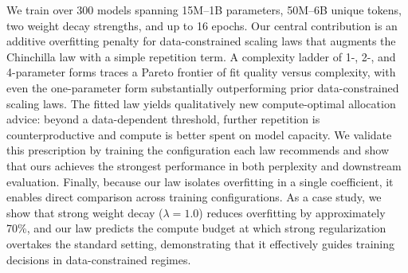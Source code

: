 We train over 300 models spanning 15M--1B parameters, 50M--6B unique tokens, two weight decay strengths, and up to 16 epochs. Our central contribution is an additive overfitting penalty for data-constrained scaling laws that augments the Chinchilla law with a simple repetition term. A complexity ladder of 1-, 2-, and 4-parameter forms traces a Pareto frontier of fit quality versus complexity, with even the one-parameter form substantially outperforming prior data-constrained scaling laws. The fitted law yields qualitatively new compute-optimal allocation advice: beyond a data-dependent threshold, further repetition is counterproductive and compute is better spent on model capacity. We validate this prescription by training the configuration each law recommends and show that ours achieves the strongest performance in both perplexity and downstream evaluation. Finally, because our law isolates overfitting in a single coefficient, it enables direct comparison across training configurations. As a case study, we show that strong weight decay ($\lambda = 1.0$) reduces overfitting by approximately 70\%, and our law predicts the compute budget at which strong regularization overtakes the standard setting, demonstrating that it effectively guides training decisions in data-constrained regimes.
 

